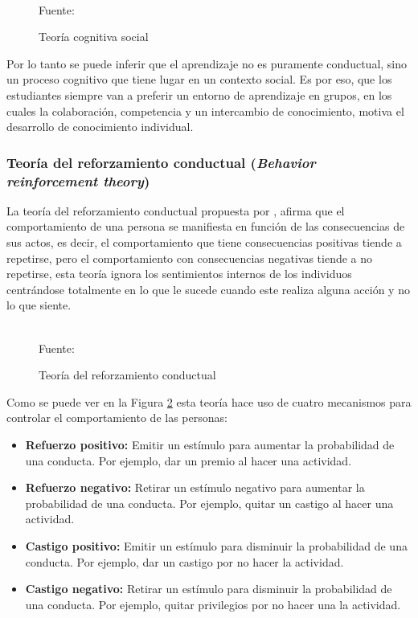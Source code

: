 \begin{figure}[ht]
\caption{Teoría cognitiva social}
\label{img:TCS}
\centering

\\
{\footnotesize Fuente: }
\end{figure}

Por lo tanto se puede inferir que el aprendizaje no es puramente conductual, sino un proceso cognitivo que 
tiene lugar en un contexto social. Es por eso, que los estudiantes siempre van a preferir un entorno de 
aprendizaje en grupos, en los cuales la colaboración, competencia y un intercambio de conocimiento, motiva el
desarrollo de conocimiento individual.

\subsubsection{Teoría del reforzamiento conductual (\textit{Behavior reinforcement theory})}

La teoría del reforzamiento conductual propuesta por , afirma que el 
comportamiento de una persona se manifiesta en función de las consecuencias de sus actos, es decir, el 
comportamiento que tiene consecuencias positivas tiende a repetirse, pero el comportamiento con consecuencias
negativas tiende a no repetirse, esta teoría ignora los sentimientos internos de los individuos centrándose 
totalmente en lo que le sucede cuando este realiza alguna acción y no lo que siente.

\begin{figure}[ht]
\caption{Teoría del reforzamiento conductual}
\label{img:TRC}
\centering

\\
{\footnotesize Fuente: \citeA<basada en>{skinner1969contingencies}}
\end{figure}

Como se puede ver en la Figura \ref{img:TRC} esta teoría hace uso de cuatro mecanismos para controlar el
comportamiento de las personas:

\begin{itemize}
\item \textbf{Refuerzo positivo:} Emitir un estímulo para aumentar la probabilidad de una conducta. Por 
ejemplo, dar un premio al hacer una actividad.
\item \textbf{Refuerzo negativo:} Retirar un estímulo negativo para aumentar la probabilidad de una conducta.
Por ejemplo, quitar un castigo al hacer una actividad.
\item \textbf{Castigo positivo:} Emitir un estímulo para disminuir la probabilidad de una conducta. Por 
ejemplo, dar un castigo por no hacer la actividad.
\item \textbf{Castigo negativo:} Retirar un estímulo para disminuir la probabilidad de una conducta. Por 
ejemplo, quitar privilegios por no hacer una la actividad.
\end{itemize}

